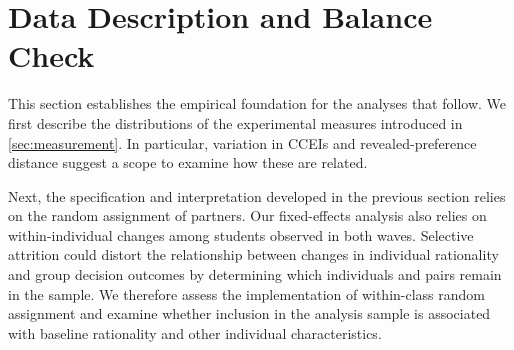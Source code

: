 \documentclass[11 pt]{article}
\begin{document}




\section{Data Description and Balance Check}

This section establishes the empirical foundation for the analyses that follow. We first describe the distributions of the experimental measures introduced in \autoref{sec:measurement}. In particular, variation in CCEIs and revealed-preference distance suggest a scope to examine how these are related. 

Next, the specification and interpretation developed in the previous section relies on the random assignment of partners. Our fixed-effects analysis also relies on within-individual changes among students observed in both waves. Selective attrition could distort the relationship between changes in individual rationality and group decision outcomes by determining which individuals and pairs remain in the sample. We therefore assess the implementation of within-class random assignment and examine whether inclusion in the analysis sample is associated with baseline rationality and other individual characteristics.
\end{document}
